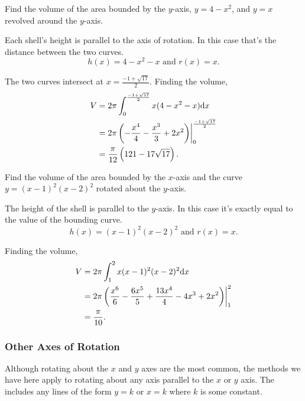 \begin{example}
	Find the volume of the area bounded by the $y$-axis, $y=4-x^2$, and $y=x$ revolved around the $y$-axis.
\end{example}
\begin{answer}
	Each shell's height is parallel to the axis of rotation.
	In this case that's the distance between the two curves.
	\begin{equation*}
		h(x) = 4-x^2-x \text{ and } r(x)=x.
	\end{equation*}
	
	The two curves intersect at $x=\frac{-1+\sqrt{17}}{2}$.
	Finding the volume,
	\begin{align*}
		V &= 2\pi\int_{0}^{\frac{-1+\sqrt{17}}{2}}{x(4-x^2-x)\mathrm{d} x} \\
		&= 2\pi\left(-\frac{x^4}{4}-\frac{x^3}{3}+2x^2\right)\biggr\rvert_{0}^{\frac{-1+\sqrt{17}}{2}} \\
		&= \frac{\pi}{12}\left(121-17\sqrt{17}\right).
	\end{align*}
\end{answer}

\begin{example}
	Find the volume of the area bounded by the $x$-axis and the curve $y=(x-1)^2(x-2)^2$ rotated about the $y$-axis.
\end{example}
\begin{answer}
	The height of the shell is parallel to the $y$-axis.
	In this case it's exactly equal to the value of the bounding curve.
	\begin{equation*}
		h(x)=(x-1)^2(x-2)^2 \text{ and } r(x)=x.
	\end{equation*}
	
	Finding the volume,
	\begin{align*}
		V &= 2\pi\int_{1}^{2}{x(x-1)^2(x-2)^2\mathrm{d} x} \\
		&= 2\pi\left(\frac{x^6}{6}-\frac{6x^5}{5}+\frac{13x^4}{4}-4x^3+2x^2\right)\biggr\rvert_{1}^{2} \\
		&= \frac{\pi}{10}.
	\end{align*}
\end{answer}

\subsubsection{Other Axes of Rotation}
Although rotating about the $x$ and $y$ axes are the most common, the methods we have here apply to rotating about any axis parallel to the $x$ or $y$ axis.
The includes any lines of the form $y=k$ or $x=k$ where $k$ is some constant. \\


